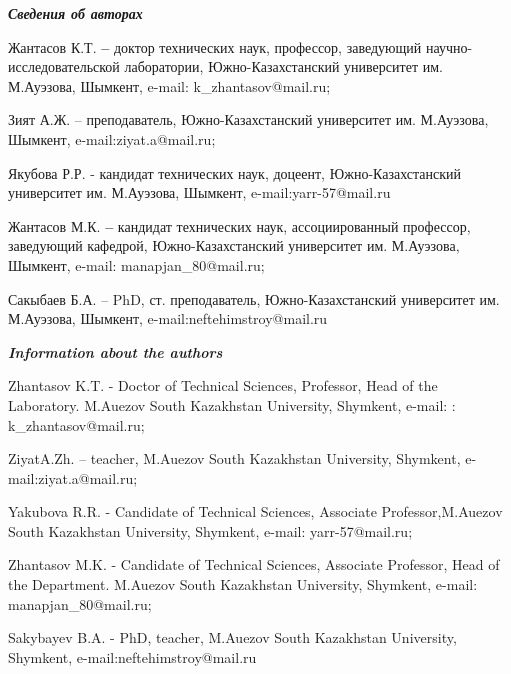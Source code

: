 \emph{\textbf{Сведения об авторах}}

Жантасов К.Т. \textbf{--} доктор технических наук, профессор, заведующий
научно-исследовательской лаборатории, Южно-Казахстанский университет им.
М.Ауэзова, Шымкент, e-mail: k\_zhantasov@mail.ru;

Зият А.Ж. -- преподаватель, Южно-Казахстанский университет им.
М.Ауэзова, Шымкент, e-mail:ziyat.a@mail.ru;

Якубова Р.Р. - кандидат технических наук, доцеент, Южно-Казахстанский
университет им. М.Ауэзова, Шымкент, e-mail:yarr-57@mail.ru

Жантасов М.К. \textbf{--} кандидат технических наук, ассоциированный
профессор, заведующий кафедрой, Южно-Казахстанский университет им.
М.Ауэзова, Шымкент, e-mail: manapjan\_80@mail.ru;

Сакыбаев Б.А. -- PhD, ст. преподаватель, Южно-Казахстанский университет
им. М.Ауэзова, Шымкент, e-mail:neftehimstroy@mail.ru

\emph{\textbf{Information about the authors}}

Zhantasov K.T. - Doctor of Technical Sciences, Professor, Head of the
Laboratory. M.Auezov South Kazakhstan University, Shymkent, e-mail: :
k\_zhantasov@mail.ru;

ZiyatA.Zh. -- teacher, M.Auezov South Kazakhstan University, Shymkent,
e-mail:ziyat.a@mail.ru;

Yakubova R.R. - Candidate of Technical Sciences, Associate
Professor,M.Auezov South Kazakhstan University, Shymkent, e-mail:
yarr-57@mail.ru;

Zhantasov M.K. - Candidate of Technical Sciences, Associate Professor,
Head of the Department. M.Auezov South Kazakhstan University, Shymkent,
e-mail: manapjan\_80@mail.ru;

Sakybayev B.A. - PhD, teacher, M.Auezov South Kazakhstan University,
Shymkent, e-mail:neftehimstroy@mail.ru